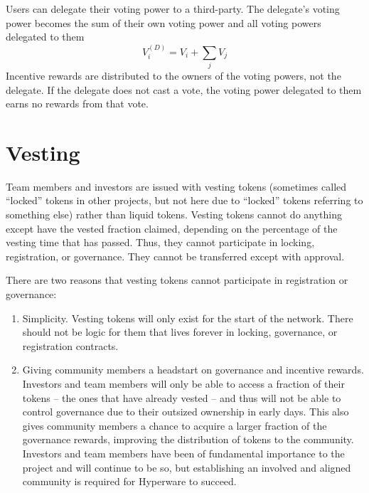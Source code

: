 \documentclass{article}
\begin{document}
Users can delegate their voting power to a third-party.
The delegate's voting power becomes the sum of their own voting power and all voting powers delegated to them
\begin{equation}
V^{(D)}_i = V_i + \sum_j V_j
\end{equation}
Incentive rewards are distributed to the owners of the voting powers, not the delegate.
If the delegate does not cast a vote, the voting power delegated to them earns no rewards from that vote.

\section{Vesting}\label{sec:vesting}

Team members and investors are issued with vesting tokens (sometimes called ``locked'' tokens in other projects, but not here due to ``locked'' tokens referring to something else) rather than liquid tokens.
Vesting tokens cannot do anything except have the vested fraction claimed, depending on the percentage of the vesting time that has passed.
Thus, they cannot participate in locking, registration, or governance.
They cannot be transferred except with approval.

There are two reasons that vesting tokens cannot participate in registration or governance:
\begin{enumerate}
    \item Simplicity.
         Vesting tokens will only exist for the start of the network.
         There should not be logic for them that lives forever in locking, governance, or registration contracts.
    \item Giving community members a headstart on governance and incentive rewards.
         Investors and team members will only be able to access a fraction of their tokens -- the ones that have already vested -- and thus will not be able to control governance due to their outsized ownership in early days.
         This also gives community members a chance to acquire a larger fraction of the governance rewards, improving the distribution of tokens to the community.
         Investors and team members have been of fundamental importance to the project and will continue to be so, but establishing an involved and aligned community is required for Hyperware to succeed.
\end{enumerate}
\end{document}
